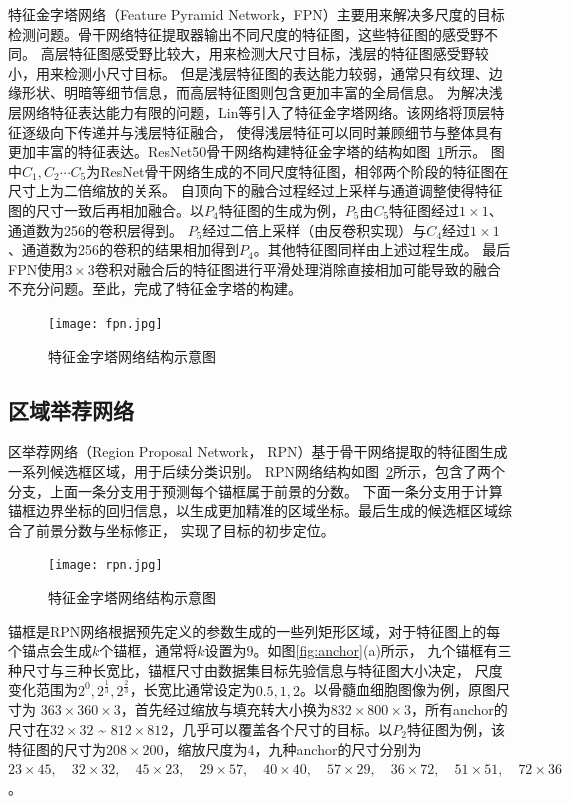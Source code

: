 特征金字塔网络（Feature Pyramid Network，FPN）主要用来解决多尺度的目标检测问题。骨干网络特征提取器输出不同尺度的特征图，这些特征图的感受野不同。
高层特征图感受野比较大，用来检测大尺寸目标，浅层的特征图感受野较小，用来检测小尺寸目标。
但是浅层特征图的表达能力较弱，通常只有纹理、边缘形状、明暗等细节信息，而高层特征图则包含更加丰富的全局信息。
为解决浅层网络特征表达能力有限的问题，Lin等\cite{2017Feature}引入了特征金字塔网络。该网络将顶层特征逐级向下传递并与浅层特征融合，
使得浅层特征可以同时兼顾细节与整体具有更加丰富的特征表达。ResNet50骨干网络构建特征金字塔的结构如图~\ref{fig:fpn}所示。
图中$C_1,C_2 \cdots C_5$为ResNet骨干网络生成的不同尺度特征图，相邻两个阶段的特征图在尺寸上为二倍缩放的关系。
自顶向下的融合过程经过上采样与通道调整使得特征图的尺寸一致后再相加融合。以$P_4$特征图的生成为例，$P_5$由$C_5$特征图经过$1\times1$、通道数为256的卷积层得到。
$P_5$经过二倍上采样（由反卷积实现）与$C_4$经过$1\times1$、通道数为256的卷积的结果相加得到$P_4$。其他特征图同样由上述过程生成。
最后FPN使用$3 \times 3$卷积对融合后的特征图进行平滑处理消除直接相加可能导致的融合不充分问题。至此，完成了特征金字塔的构建。

\begin{figure}[htbp]            
  \centering             
  \texttt{[image: fpn.jpg]}             
  \caption{特征金字塔网络结构示意图}             
  \label{fig:fpn}    
\end{figure}    

\subsection{区域举荐网络}

区举荐网络（Region Proposal Network， RPN）基于骨干网络提取的特征图生成一系列候选框区域，用于后续分类识别。
RPN网络结构如图~\ref{fig:rpn}所示，包含了两个分支，上面一条分支用于预测每个锚框属于前景的分数。
下面一条分支用于计算锚框边界坐标的回归信息，以生成更加精准的区域坐标。最后生成的候选框区域综合了前景分数与坐标修正，
实现了目标的初步定位。

\begin{figure}[htbp]              
  \centering                
  \texttt{[image: rpn.jpg]}                
  \caption{特征金字塔网络结构示意图}                
  \label{fig:rpn}     
\end{figure}   

锚框是RPN网络根据预先定义的参数生成的一些列矩形区域，对于特征图上的每个锚点会生成$k$个锚框，通常将$k$设置为$9$。如图\ref{fig:anchor}(a)所示，
九个锚框有三种尺寸与三种长宽比，锚框尺寸由数据集目标先验信息与特征图大小决定，
尺度变化范围为$2^0, 2^{\frac{1}{3}},  2^{\frac{2}{3}}$，长宽比通常设定为$0.5, 1, 2$。以骨髓血细胞图像为例，原图尺寸为
$363 \times 360 \times 3$，首先经过缩放与填充转大小换为$832 \times 800 \times 3$，所有anchor的尺寸在$32 \times 32$ \textasciitilde
$812 \times 812$，几乎可以覆盖各个尺寸的目标。以$P_2$特征图为例，该特征图的尺寸为$208 \times 200$，缩放尺度为4，九种anchor的尺寸分别为
$23 \times 45,\quad32 \times 32,\quad45 \times 23,\quad29 \times 57,\quad40 \times 40,\quad57 \times 29,\quad36 \times 72,\quad51 \times 51,\quad72 \times 36$。

